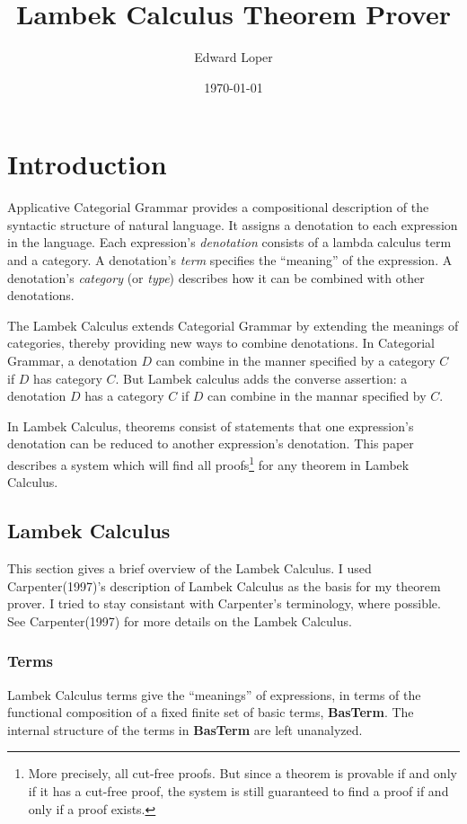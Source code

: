 \documentclass[11pt]{article}
\begin{document}
\title{Lambek Calculus Theorem Prover}
\author{Edward Loper}
\date{\today}
\maketitle

\section{Introduction}

Applicative Categorial Grammar provides a compositional description of
the syntactic structure of natural language.  It assigns a denotation
to each expression in the language.  Each expression's
\emph{denotation} consists of a lambda calculus term and a category.
A denotation's \emph{term} specifies the ``meaning'' of the
expression.  A denotation's \emph{category} (or \emph{type}) describes
how it can be combined with other denotations.

The Lambek Calculus extends Categorial Grammar by extending the
meanings of categories, thereby providing new ways to combine
denotations.  In Categorial Grammar, a denotation $D$ can combine in
the manner specified by a category $C$ if $D$ has category $C$.  But
Lambek calculus adds the converse assertion: a denotation $D$ has a
category $C$ if $D$ can combine in the mannar specified by $C$.

In Lambek Calculus, theorems consist of statements that one
expression's denotation can be reduced to another expression's
denotation.  This paper describes a system which will find all
proofs\footnote{More precisely, all cut-free proofs.  But since a
theorem is provable if and only if it has a cut-free proof, the system
is still guaranteed to find a proof if and only if a proof exists.}
for any theorem in Lambek Calculus.

\subsection{Lambek Calculus}

This section gives a brief overview of the Lambek Calculus.  I used
Carpenter(1997)'s description of Lambek Calculus as the basis for my
theorem prover.  I tried to stay consistant with Carpenter's
terminology, where possible.  See Carpenter(1997) for more details on
the Lambek Calculus.

\subsubsection{Terms}
Lambek Calculus terms give the ``meanings'' of expressions, in terms
of the functional composition of a fixed finite set of basic terms,
\textbf{BasTerm}.  The internal structure of the terms in
\textbf{BasTerm} are left unanalyzed.
\end{document}
